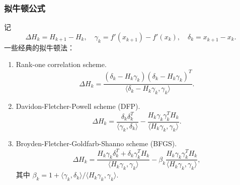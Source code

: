 \documentclass[handout,10pt]{beamer} %
\begin{document}
\begin{frame}[fragile]
\frametitle{拟牛顿公式}

\begin{example}[示例]\label{eg_1_3_2}
记
$$
    \Delta H_k = H_{k+1}^{} - H_{k}^{}, \quad \gamma_k = f'(x_{k+1}^{}) - f'(x_k), \quad \delta_k = x_{k+1}^{}-x_k.
$$
 一些经典的拟牛顿法：%
\begin{enumerate}
\item Rank-one correlation scheme.
  $$
    \Delta H_k = \frac{(\delta_k-H_k\gamma_k)(\delta_k-H_k\gamma_k)_{}^{T}}{\langle \delta_k-H_k\gamma_k,\gamma_k \rangle}.
  $$
\item Davidon-Fletcher-Powell scheme (DFP).
    $$
    \Delta H_k = \frac{\delta_k \delta_k^{T}}{\langle \gamma_k,\delta_k\rangle }
        -  \frac{ H_k\gamma_k \gamma_k^T H_k  }{\langle H_k\gamma_k,\gamma_k \rangle}.
  $$
\item Broyden-Fletcher-Goldfarb-Shanno scheme (BFGS).
    $$
    \Delta H_k = \frac{ H_k \gamma_k \delta_k^{T} + \delta_k\gamma_k^T H_k}{\langle H_k\gamma_k,\gamma_k  \rangle }
        -  \beta_k \frac{ H_k\gamma_k \gamma_k^T H_k  }{\langle H_k\gamma_k,\gamma_k \rangle},
  $$
  其中 $\beta_k = 1+ \langle \gamma_k,\delta_k \rangle / \langle H_k \gamma_k ,\gamma_k \rangle$.
\end{enumerate}
\end{example}


\end{frame}


\end{document}
